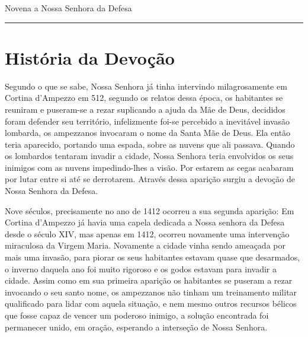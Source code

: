 \documentclass[a4paper,14pt]{extarticle} \usepackage[utf8]{inputenc}
\begin{document}
\begin{center}
  {\huge Novena a Nossa Senhora da Defesa}
\end{center}


\par\noindent\rule{\textwidth}{0.4pt}

\tableofcontents
\thispagestyle{empty}

\newpage

\section{História da Devoção}

Segundo o que se sabe, Nossa Senhora já tinha intervindo milagrosamente em Cortina d’Ampezzo em 512, segundo os relatos dessa época, os habitantes se reuniram e puseram-se a rezar suplicando a ajuda da Mãe de Deus, decididos foram defender seu território, infelizmente foi-se percebido a inevitável invasão lombarda, os ampezzanos invocaram o nome da Santa Mãe de Deus. Ela então teria aparecido, portando uma espada, sobre as nuvens que ali passava. Quando os lombardos tentaram invadir a cidade, Nossa Senhora teria envolvidos os seus inimigos com as nuvens impedindo-lhes a visão. Por estarem as cegas acabaram por lutar entre si até se derrotarem. Através dessa aparição surgiu a devoção de Nossa Senhora da Defesa.

Nove séculos, precisamente no ano de 1412 ocorreu a sua segunda aparição: Em Cortina d’Ampezzo já havia uma capela dedicada a Nossa senhora da Defesa desde o século XIV, mas apenas em 1412, ocorreu novamente uma intervenção miraculosa da Virgem Maria. Novamente a cidade vinha sendo ameaçada por mais uma invasão, para piorar os seus habitantes estavam quase que desarmados, o inverno daquela ano foi muito rigoroso e os godos estavam para invadir a cidade. Assim como em sua primeira aparição os habitantes se puseram a rezar invocando o seu santo nome, os ampezzanos não tinham um treinamento militar qualificado para lidar com aquela situação, e nem mesmo outros recursos bélicos que fosse capaz de vencer um poderoso inimigo, a solução encontrada foi permanecer unido, em oração, esperando a interseção de Nossa Senhora.
\end{document}
